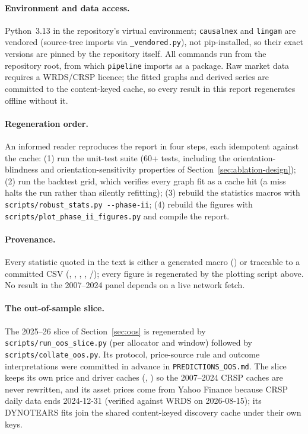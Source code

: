 \paragraph{Environment and data access.} Python~3.13 in the repository's
virtual environment; \texttt{causalnex} and \texttt{lingam} are vendored
(source-tree imports via \texttt{\_vendored.py}), not pip-installed, so
their exact versions are pinned by the repository itself. All commands run
from the repository root, from which \texttt{pipeline} imports as a package.
Raw market data requires a WRDS/CRSP licence; the fitted graphs and derived
series are committed to the content-keyed cache, so every result in this
report regenerates offline without it.

\paragraph{Regeneration order.} An informed reader reproduces the report in
four steps, each idempotent against the cache: (1) run the unit-test suite
(60+ tests, including the orientation-blindness and orientation-sensitivity
properties of Section~\ref{sec:ablation-design}); (2) run the backtest grid,
which verifies every graph fit as a cache hit (a miss halts the run
rather than silently refitting); (3) rebuild the statistics macros with
\texttt{scripts/robust\_stats.py -{}-phase-ii}; (4) rebuild the figures with
\texttt{scripts/plot\_phase\_ii\_figures.py} and compile the report.
\paragraph{Provenance.} Every statistic quoted in the text is either a
generated macro () or traceable to a
committed CSV (,
, ,
,
/); every figure is
regenerated by the plotting script above. No result in the 2007--2024
panel depends on a live network fetch.

\paragraph{The out-of-sample slice.} The 2025--26 slice of
Section~\ref{sec:oos} is regenerated by
\texttt{scripts/run\_oos\_slice.py} (per allocator and window) followed
by \texttt{scripts/collate\_oos.py}. Its protocol, price-source rule
and outcome interpretations were committed in advance in
\texttt{PREDICTIONS\_OOS.md}. The slice keeps its own price and driver
caches (, ) so the
2007--2024 CRSP caches are never rewritten, and its asset prices come
from Yahoo Finance because CRSP daily data ends 2024-12-31 (verified
against WRDS on 2026-08-15); its DYNOTEARS fits join the shared
content-keyed discovery cache under their own keys.
